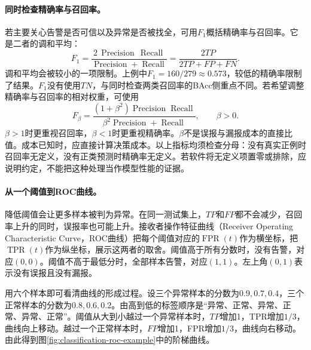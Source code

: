 \paragraph{同时检查精确率与召回率。}
若主要关心告警是否可信以及异常是否被找全，可用$F_1$概括精确率与召回率。它是二者的调和平均：
\begin{equation}
 F_1=\frac{2\,\operatorname{Precision}\,\operatorname{Recall}}
 {\operatorname{Precision}+\operatorname{Recall}}
 =\frac{2TP}{2TP+FP+FN}.
 \label{eq:classification-f1}
\end{equation}
调和平均会被较小的一项限制。上例中$F_1=160/279\approx0.573$，较低的精确率限制了结果。$F_1$没有使用$TN$，与同时检查两类召回率的BAcc侧重点不同。若希望调整精确率与召回率的相对权重，可使用
\begin{equation}
 F_\beta=\frac{(1+\beta^2)\operatorname{Precision}\operatorname{Recall}}
 {\beta^2\operatorname{Precision}+\operatorname{Recall}},\qquad\beta>0.
 \label{eq:classification-fbeta}
\end{equation}
$\beta>1$时更重视召回率，$\beta<1$时更重视精确率。$\beta$不是误报与漏报成本的直接比值。成本已知时，应直接计算决策成本。以上指标均须检查分母：没有真实正例时召回率无定义，没有正类预测时精确率无定义。若软件将无定义项置零或排除，应说明约定，不能把这种处理当作模型性能的证据。

\paragraph{从一个阈值到ROC曲线。}
降低阈值会让更多样本被判为异常。在同一测试集上，$TP$和$FP$都不会减少，召回率上升的同时，误报率也可能上升。接收者操作特征曲线（Receiver Operating Characteristic Curve，ROC曲线）把每个阈值对应的$\operatorname{FPR}(t)$作为横坐标，把$\operatorname{TPR}(t)$作为纵坐标，展示这两者的取舍。阈值高于所有分数时，没有告警，对应$(0,0)$。阈值不高于最低分时，全部样本告警，对应$(1,1)$。左上角$(0,1)$表示没有误报且没有漏报。

用六个样本即可看清曲线的形成过程。设三个异常样本的分数为$0.9,0.7,0.4$，三个正常样本的分数为$0.8,0.6,0.2$。由高到低的标签顺序是“异常、正常、异常、正常、异常、正常”。阈值从大到小越过一个异常样本时，$TP$增加1，TPR增加$1/3$，曲线向上移动。越过一个正常样本时，$FP$增加1，FPR增加$1/3$，曲线向右移动。由此得到图\ref{fig:classification-roc-example}中的阶梯曲线。

